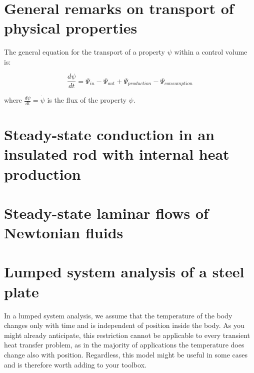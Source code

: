 \documentclass[10pt]{article}
\begin{document}
\newpage

\tableofcontents

\newpage

\setlength{\parskip}{0.6em}
\setlength{\parindent}{0cm}


\,\,\,

\normalsize

\section{General remarks on transport of physical properties}

The general equation for the transport of a property $\psi$ within a control volume is:

\begin{equation}
\frac{d \psi}{dt} = \Psi_{in} - \Psi_{out} + \Psi_{production} - \Psi_{consumption}
\end{equation}

where $\frac{d \psi}{dt} = \dot{\psi}$ is the flux of the property $\psi$.

\newpage

\section{Steady-state conduction in an insulated rod with internal heat production}



\newpage

\section{Steady-state laminar flows of Newtonian fluids}



\newpage

\section{Lumped system analysis of a steel plate}

In a lumped system analysis, we assume that the temperature of the body changes only with time and is independent of position inside the body. As you might already anticipate, this restriction cannot be applicable to every transient heat transfer problem, as in the majority of applications the temperature does change also with position. Regardless, this model might be useful in some cases and is therefore worth adding to your toolbox.
\end{document}
